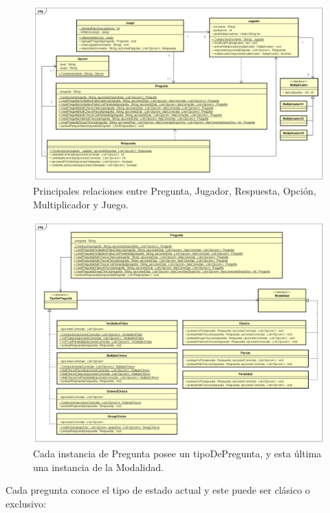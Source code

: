\documentclass[titlepage,a4paper]{article}
\begin{document}
\begin{figure}[H]
\centering
\includegraphics[width=1\textwidth]{img/UMLClases2.png}
\caption{\label{fig:class01}Principales relaciones entre Pregunta, Jugador, Respuesta, Opción, Multiplicador y Juego.}
\end{figure}

\begin{figure}[H]
\centering
\includegraphics[width=1\textwidth]{img/UMLClases3.png}
\caption{\label{fig:class01}Cada instancia de Pregunta posee un tipoDePregunta, y esta última una instancia de la Modalidad.}
\end{figure}

\newpage
Cada pregunta conoce el tipo de estado actual y este puede ser clásico o exclusivo:
\end{document}
